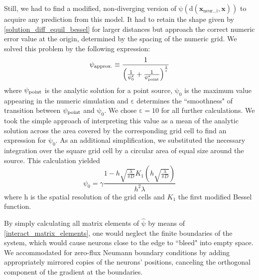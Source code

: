 \documentclass[10pt,letterpaper]{article}
\begin{document}
Still, we had to find a modified, non-diverging version of $\mathrm{\psi (d(\mathbf{x}_{\mathrm{neur.},i},\mathbf{x}))}$ to acquire any prediction from this model. It had to retain the shape given by \eqref{solution_diff_equil_bessel} for larger distances but approach the correct numeric error value at the origin, determined by the spacing of the numeric grid. We solved this problem by the following expression:
\begin{equation}
\psi_{\rm approx.} \equiv \frac{1}{\left(\frac{1}{\psi_0^\varepsilon} + \frac{1}{\psi_{\rm point}^\varepsilon}\right)^{\frac{1}{\varepsilon}}}
\label{Numeric_Solution_Expression_Trick}
\end{equation}
where $\psi_{\rm point}$ is the analytic solution for a point source, $\mathrm{\psi_0}$ is the maximum value appearing in the numeric simulation and $\mathrm{\varepsilon}$ determines the ``smoothness" of transition between $\psi_{\rm point}$ and $\mathrm{\psi_0}$. We chose $\mathrm{\varepsilon=10}$ for all further calculations. We took the simple approach of interpreting this value as a mean of the analytic solution across the area covered by the corresponding grid cell to find an expression for $\mathrm{\psi_0}$. As an additional simplification, we substituted the necessary integration over the square grid cell by a circular area of equal size around the source. This calculation yielded
\begin{equation}
\psi_0 = \gamma \frac{1-h\sqrt{\frac{\lambda}{\pi D}} K_1\left( h\sqrt{\frac{\lambda}{\pi D}}\right) }{h^2 \lambda}
\label{Numeric_Grid_Bessel_Approx}
\end{equation}
where $\mathrm{h}$ is the spatial resolution of the grid cells and $K_1$ the first modified Bessel function.

By simply calculating all matrix elements of $\mathrm{\hat{\psi}}$ by means of \eqref{interact_matrix_elements}, one would neglect the finite boundaries of the system, which would cause neurons close to the edge to ``bleed" into empty space. We accommodated for zero-flux Neumann boundary conditions by adding appropriately mirrored copies of the neurons' positions, canceling the orthogonal component of the gradient at the boundaries. 
\end{document}
